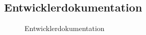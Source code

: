 \subsection{Entwicklerdokumentation}
\label{app:Doc}
\begin{figure}[htb]
\centering
{}
\caption{Entwicklerdokumentation}
\end{figure}

    